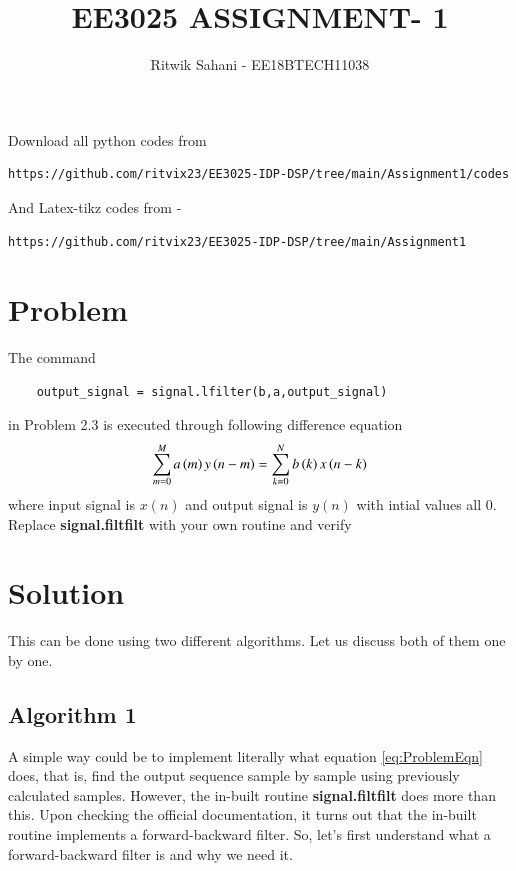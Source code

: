\documentclass[journal,12pt,twocolumn]{IEEEtran}
\begin{document}
     \def\rightbox#1{\makebox[0in][r]{#1}}
     \def\centbox#1{\makebox[0in]{#1}}
     \def\topbox#1{\raisebox{-\baselineskip}[0in][0in]{#1}}
     \def\midbox#1{\raisebox{-0.5\baselineskip}[0in][0in]{#1}}
\vspace{3cm}
\title{EE3025 ASSIGNMENT- 1}
\author{Ritwik Sahani - EE18BTECH11038}
\maketitle
\newpage
\bigskip
\renewcommand{\thefigure}{\theenumi}
\renewcommand{\thetable}{\theenumi}
Download all python codes from 
\begin{lstlisting}
https://github.com/ritvix23/EE3025-IDP-DSP/tree/main/Assignment1/codes
\end{lstlisting}
And Latex-tikz codes from - 
\begin{lstlisting}
https://github.com/ritvix23/EE3025-IDP-DSP/tree/main/Assignment1
\end{lstlisting}

%

\section{Problem}
    
The command
\begin{lstlisting}
    output_signal = signal.lfilter(b,a,output_signal)
\end{lstlisting}
in Problem 2.3 is executed through following difference equation 
    \begin{align} \label{eq:ProblemEqn}
        \sum _{m=0}^{M}a\brak{m}y\brak{n-m}=\sum _{k=0}^{N}b\brak{k}x\brak{n-k}
    \end{align}
 where input signal is $x(n)$ and output signal is $y(n)$ with intial values all 0. Replace \textbf{signal.filtfilt} with your own routine and verify
  \section{Solution}
  This can be done using two different algorithms. Let us discuss both of them one by one.
  
  \subsection{Algorithm 1}
  A simple way could be to implement literally what equation \ref{eq:ProblemEqn} does, that is, find the output sequence sample by sample using previously calculated samples. However, the in-built routine \textbf{signal.filtfilt} does more than this. Upon checking the official documentation, it turns out that the in-built routine implements a forward-backward filter. So, let's first understand what a forward-backward filter is and why we need it.
  
\end{document}
